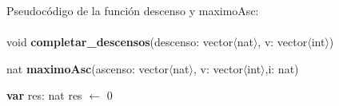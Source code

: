 \vspace*{1cm}
Pseudocódigo de la función descenso y maximoAsc:
\\
\\

void \textbf{completar\_descensos}(descenso: vector$\langle$nat$\rangle$, v: vector$\langle$int$\rangle$)\\
	\begin{algorithm}[H]
\BlankLine		
  \end{algorithm}

\vspace*{1cm}

nat  \textbf{maximoAsc}(ascenso: vector$\langle$nat$\rangle$, v: vector$\langle$int$\rangle$,i: nat)\\
	\begin{algorithm}[H]
	\BlankLine		
      \textbf{var} res: nat
      res $\leftarrow$ 0
	\BlankLine		
  \end{algorithm}
